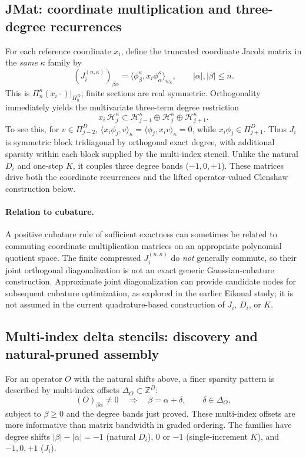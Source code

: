 \documentclass[11pt]{article}
\begin{document}
\subsection{JMat: coordinate multiplication and three-degree recurrences}
\label{sec:full_jmat}
For each reference coordinate $x_i$, define the truncated coordinate
Jacobi matrix in the \emph{same} $\kappa$ family by
\begin{equation}\label{eq:full_J_def}
 (J_i^{(n,\kappa)})_{\beta\alpha}
 =\langle\phi_\beta^\kappa,x_i\phi_\alpha^\kappa\rangle_{w_\kappa},
 \qquad |\alpha|,|\beta|\le n.
\end{equation}
This is $\Pi_n^\kappa(x_i\cdot)\vert_{\Pi_n^D}$; finite sections
are real symmetric.  Orthogonality immediately yields the
multivariate three-term degree restriction
\begin{equation}\label{eq:full_J_degree}
 x_i\,\mathcal H_j^\kappa
 \subset \mathcal H_{j-1}^\kappa\oplus
 \mathcal H_j^\kappa\oplus\mathcal H_{j+1}^\kappa.
\end{equation}
To see this, for $v\in\Pi_{j-2}^D$,
$\langle x_i\phi_j,v\rangle_\kappa
 =\langle\phi_j,x_iv\rangle_\kappa=0$, while
$x_i\phi_j\in\Pi_{j+1}^D$.  Thus $J_i$ is symmetric block
tridiagonal by orthogonal exact degree, with additional sparsity
within each block supplied by the multi-index stencil.
Unlike the natural $D_i$ and one-step $K$, it couples three degree
bands ($-1,0,+1$).  These matrices drive both the coordinate
recurrences and the lifted operator-valued Clenshaw construction below.

\paragraph{Relation to cubature.}
A positive cubature rule of sufficient exactness can sometimes be
related to commuting coordinate multiplication matrices on an
appropriate polynomial quotient space.  The finite compressed
$J_i^{(n,\kappa)}$ do \emph{not} generally commute, so their joint
orthogonal diagonalization is not an exact generic Gaussian-cubature
construction.  Approximate joint diagonalization can provide
candidate nodes for subsequent cubature optimization, as explored
in the earlier Eikonal study; it is not assumed in the current
quadrature-based construction of $J_i$, $D_i$, or $K$.

\subsection{Multi-index delta stencils: discovery and natural-pruned assembly}
\label{sec:full_stencils}
For an operator $O$ with the natural shifts above, a finer sparsity
pattern is described by multi-index offsets
$\Delta_O\subset\mathbb Z^D$:
\begin{equation}\label{eq:full_delta_rule}
 (O)_{\beta\alpha}\ne0
 \quad\Longrightarrow\quad
 \beta=\alpha+\delta,\qquad \delta\in\Delta_O,
\end{equation}
subject to $\beta\ge0$ and the degree bands just proved.  These
multi-index offsets are more informative than matrix bandwidth in
graded ordering.  The families have degree shifts
$|\beta|-|\alpha|=-1$ (natural $D_i$), $0$ or $-1$
(single-increment $K$), and $-1,0,+1$ ($J_i$).
\end{document}
